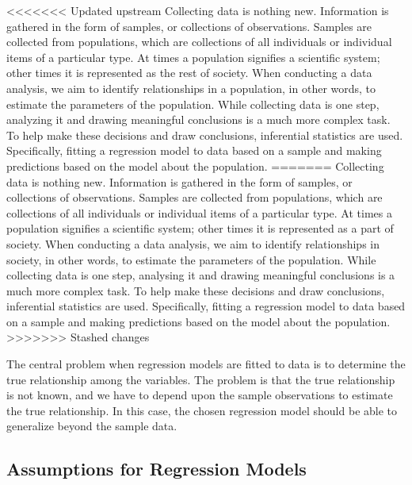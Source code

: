 <<<<<<< Updated upstream
Collecting data is nothing new. Information is gathered in the form of samples, or collections of observations. Samples are collected from populations, which are collections of all individuals or individual items of a particular type. At times a population signifies a scientific system; other times it is represented as the rest of society. When conducting a data analysis, we aim to identify relationships in a population, in other words, to estimate the parameters of the population. While collecting data is one step, analyzing it and drawing meaningful conclusions is a much more complex task. To help make these decisions and draw conclusions, inferential statistics are used. \cite{ProbAndStat} Specifically, fitting a regression model to data based on a sample and making predictions based on the model about the population. \newline
=======
Collecting data is nothing new. Information is gathered in the form of samples, or collections of observations. Samples are collected from populations, which are collections of all individuals or individual items of a particular type. At times a population signifies a scientific system; other times it is represented as a part of society. When conducting a data analysis, we aim to identify relationships in society, in other words, to estimate the parameters of the population. While collecting data is one step, analysing it and drawing meaningful conclusions is a much more complex task. To help make these decisions and draw conclusions, inferential statistics are used. \cite{ProbAndStat} Specifically, fitting a regression model to data based on a sample and making predictions based on the model about the population. \newline
>>>>>>> Stashed changes

\noindent The central problem when regression models are fitted to data is to determine the true relationship among the variables. The problem is that the true relationship is not known, and we have to depend upon the sample observations to estimate the true relationship. In this case, the chosen regression model should be able to generalize beyond the sample data. \newline 



\subsection{Assumptions for Regression Models}

